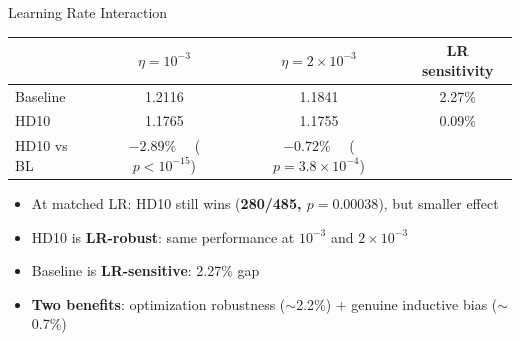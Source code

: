 \documentclass[aspectratio=169,11pt]{beamer}
\begin{document}
\begin{frame}{Learning Rate Interaction}

\begin{table}
\centering
\footnotesize
\begin{tabular}{lccc}
\toprule
& $\eta = 10^{-3}$ & $\eta = 2 \times 10^{-3}$ & LR sensitivity \\
\midrule
Baseline & 1.2116 & 1.1841 & \textcolor{worsen}{2.27\%} \\
HD10 & 1.1765 & 1.1755 & \textcolor{improve}{0.09\%} \\
\midrule
HD10 vs BL & $-2.89\%$ \ \ ($p < 10^{-15}$) & $-0.72\%$ \ \ ($p = 3.8 \times 10^{-4}$) & \\
\bottomrule
\end{tabular}
\end{table}

\medskip

\begin{itemize}
    \item At matched LR: HD10 still wins (\textbf{280/485, $p=0.00038$}), but smaller effect
    \item HD10 is \textbf{LR-robust}: same performance at $10^{-3}$ and $2\times10^{-3}$
    \item Baseline is \textbf{LR-sensitive}: 2.27\% gap
    \item \textbf{Two benefits}: optimization robustness ($\sim$2.2\%) + genuine inductive bias ($\sim$0.7\%)
\end{itemize}

\end{frame}
\end{document}
